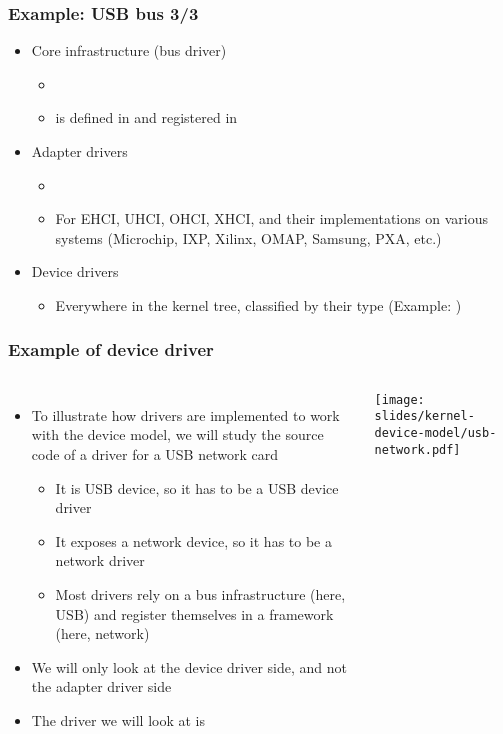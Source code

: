 \begin{frame}
  \frametitle{Example: USB bus 3/3}
  \begin{itemize}
  \item Core infrastructure (bus driver)
    \begin{itemize}
    \item {}
    \item {} is defined in
       and registered in
    \end{itemize}
  \item Adapter drivers
    \begin{itemize}
    \item {}
    \item For EHCI, UHCI, OHCI, XHCI, and their implementations on
      various systems (Microchip, IXP, Xilinx, OMAP, Samsung, PXA, etc.)
    \end{itemize}
  \item Device drivers
    \begin{itemize}
    \item Everywhere in the kernel tree, classified by their type
    (Example: )
    \end{itemize}
  \end{itemize}
\end{frame}

\begin{frame}
  \frametitle{Example of device driver}
  \begin{columns}
  \begin{itemize}
  \item To illustrate how drivers are implemented to work with the
    device model, we will study the source code of a driver for a USB
    network card
    \begin{itemize}
    \item It is USB device, so it has to be a USB device driver
    \item It exposes a network device, so it has to be a network driver
    \item Most drivers rely on a bus infrastructure (here, USB) and
      register themselves in a framework (here, network)
    \end{itemize}
  \item We will only look at the device driver side, and not the
    adapter driver side
  \item The driver we will look at is 
  \end{itemize}
      \texttt{[image: slides/kernel-device-model/usb-network.pdf]}
  \end{columns}
\end{frame}

